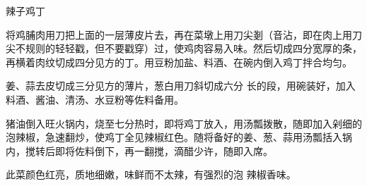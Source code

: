 \begin{recipe}{辣子鸡丁}

\ingredients



\cooking

\step 将鸡脯肉用刀把上面的一层薄皮片去，再在菜墩上用刀尖剗（音沾，即在肉上用刀尖不规则的轻轻戳，但不要戳穿）过，使鸡肉容易入味。然后切成四分宽厚的条，再横着肉纹切成四分见方的丁。用豆粉加盐、料酒、在碗内倒入鸡丁拌合均匀。

姜、蒜去皮切成三分见方的薄片，葱白用刀斜切成六分 长的段，用碗装好，加入料酒、酱油、清汤、水豆粉等佐料备用。

\step 猪油倒入旺火锅内，烧至七分热时，即将鸡丁放入，用汤瓢拨散，随即加入剁细的泡辣椒，急速翻炒，使鸡丁全见辣椒红色。随将备好的姜、葱、蒜用汤瓢括入锅内，搅转后即将佐料倒下，再一翻搅，滴醋少许，随即入席。

\notes

此菜颜色红亮，质地细嫩，味鲜而不太辣，有强烈的泡 辣椒香味。

\end{recipe}

